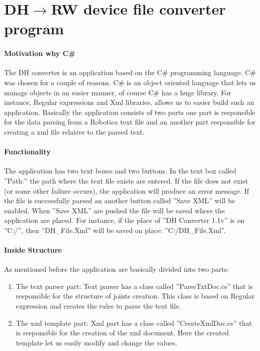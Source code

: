 \section{DH$\rightarrow$RW device file converter program}
\label{sec:program}

\paragraph{Motivation why C\#}
The DH converter is an application based on the C\# programming language. C\# was chosen for a couple of reasons. C\# is an object oriented language that lets us manage objects in an easier manner, of course C\# has a huge library. For instance, Regular expressions and Xml libraries, allows us to easier build such an application.
Basically the application consists of two parts one part is responsible for the data parsing from a Robotica text file and an another part responsible for creating a xml file relative to the parsed text.

\paragraph{Functionality}
The application has two text boxes and two buttons.
In the text box called ''Path:'' the path where the text file exists are entered. If the file does not exist (or some other failure occurs), the application will produce an error message. If the file is successfully parsed an another button called ''Save XML'' will be enabled. When ''Save XML'' are pushed the file will be saved where the application are placed. For instance, if the place of ''DH Converter 1.1v'' is on ''C:/'', then ''DH\_File.Xml'' will be saved on place: ''C:/DH\_File.Xml''.

\paragraph{Inside Structure}
As mentioned before the application are basically divided into two parts:
\begin{enumerate}
	\item The text parser part: Text parser has a class called ''ParseTxtDoc.cs'' that is responsible for the structure of joints creation. This class is based on Regular expression and creates the rules to parse the text file.\\
	\item The xml template part: Xml part has a class called ''CreateXmlDoc.cs'' that is responsible for the creation of the xml document. Here the created template let us easily modify and change the values.
\end{enumerate}
